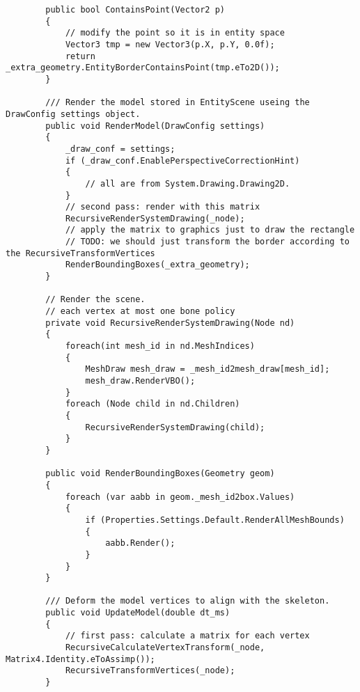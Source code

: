 \begin{scriptsize}
\begin{verbatim}
        public bool ContainsPoint(Vector2 p)
        {
            // modify the point so it is in entity space
            Vector3 tmp = new Vector3(p.X, p.Y, 0.0f);
            return _extra_geometry.EntityBorderContainsPoint(tmp.eTo2D());
        }

        /// Render the model stored in EntityScene useing the DrawConfig settings object.
        public void RenderModel(DrawConfig settings)
        {
            _draw_conf = settings;
            if (_draw_conf.EnablePerspectiveCorrectionHint)
            {
                // all are from System.Drawing.Drawing2D.
            }
            // second pass: render with this matrix
            RecursiveRenderSystemDrawing(_node);
            // apply the matrix to graphics just to draw the rectangle
            // TODO: we should just transform the border according to the RecursiveTransformVertices
            RenderBoundingBoxes(_extra_geometry);
        }

        // Render the scene.
        // each vertex at most one bone policy
        private void RecursiveRenderSystemDrawing(Node nd)
        {
            foreach(int mesh_id in nd.MeshIndices)
            {
                MeshDraw mesh_draw = _mesh_id2mesh_draw[mesh_id];
                mesh_draw.RenderVBO();
            }
            foreach (Node child in nd.Children)
            {
                RecursiveRenderSystemDrawing(child);
            }
        }

        public void RenderBoundingBoxes(Geometry geom)
        {
            foreach (var aabb in geom._mesh_id2box.Values)
            {
                if (Properties.Settings.Default.RenderAllMeshBounds)
                {
                    aabb.Render();
                }
            }
        }

        /// Deform the model vertices to align with the skeleton.
        public void UpdateModel(double dt_ms)
        {
            // first pass: calculate a matrix for each vertex
            RecursiveCalculateVertexTransform(_node, Matrix4.Identity.eToAssimp());
            RecursiveTransformVertices(_node);
        }


\end{verbatim}
\end{scriptsize}
